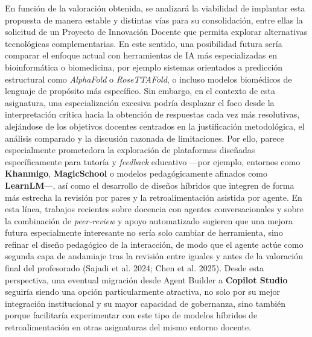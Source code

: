 \documentclass[
  11pt,
  a4paper,
  twoside]{scrreprt}
\begin{document}
En función de la valoración obtenida, se analizará la viabilidad de
implantar esta propuesta de manera estable y distintas vías para su
consolidación, entre ellas la solicitud de un Proyecto de Innovación
Docente que permita explorar alternativas tecnológicas complementarias.
En este sentido, una posibilidad futura sería comparar el enfoque actual
con herramientas de IA más especializadas en bioinformática o
biomedicina, por ejemplo sistemas orientados a predicción estructural
como \emph{AlphaFold} o \emph{RoseTTAFold}, o incluso modelos biomédicos
de lenguaje de propósito más específico. Sin embargo, en el contexto de
esta asignatura, una especialización excesiva podría desplazar el foco
desde la interpretación crítica hacia la obtención de respuestas cada
vez más resolutivas, alejándose de los objetivos docentes centrados en
la justificación metodológica, el análisis comparado y la discusión
razonada de limitaciones. Por ello, parece especialmente prometedora la
exploración de plataformas diseñadas específicamente para tutoría y
\emph{feedback} educativo ---por ejemplo, entornos como
\textbf{Khanmigo}, \textbf{MagicSchool} o modelos pedagógicamente
afinados como \textbf{LearnLM}---, así como el desarrollo de diseños
híbridos que integren de forma más estrecha la revisión por pares y la
retroalimentación asistida por agente. En esta línea, trabajos recientes
sobre docencia con agentes conversacionales y sobre la combinación de
\emph{peer-review} y apoyo automatizado sugieren que una mejora futura
especialmente interesante no sería solo cambiar de herramienta, sino
refinar el diseño pedagógico de la interacción, de modo que el agente
actúe como segunda capa de andamiaje tras la revisión entre iguales y
antes de la valoración final del profesorado (Sajadi et al. 2024; Chen
et al. 2025). Desde esta perspectiva, una eventual migración desde Agent
Builder a \textbf{Copilot Studio} seguiría siendo una opción
particularmente atractiva, no solo por su mejor integración
institucional y su mayor capacidad de gobernanza, sino también porque
facilitaría experimentar con este tipo de modelos híbridos de
retroalimentación en otras asignaturas del mismo entorno docente.
\end{document}
